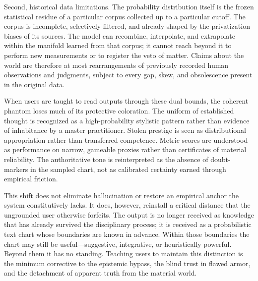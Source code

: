 Second, historical data limitations. The probability distribution itself is the frozen statistical residue of a particular corpus collected up to a particular cutoff. The corpus is incomplete, selectively filtered, and already shaped by the privatization biases of its sources. The model can recombine, interpolate, and extrapolate within the manifold learned from that corpus; it cannot reach beyond it to perform new measurements or to register the veto of matter. Claims about the world are therefore at most rearrangements of previously recorded human observations and judgments, subject to every gap, skew, and obsolescence present in the original data.

When users are taught to read outputs through these dual bounds, the coherent phantom loses much of its protective coloration. The uniform of established thought is recognized as a high-probability stylistic pattern rather than evidence of inhabitance by a master practitioner. Stolen prestige is seen as distributional appropriation rather than transferred competence. Metric scores are understood as performance on narrow, gameable proxies rather than certificates of material reliability. The authoritative tone is reinterpreted as the absence of doubt-markers in the sampled chart, not as calibrated certainty earned through empirical friction.

This shift does not eliminate hallucination or restore an empirical anchor the system constitutively lacks. It does, however, reinstall a critical distance that the ungrounded user otherwise forfeits. The output is no longer received as knowledge that has already survived the disciplinary process; it is received as a probabilistic text chart whose boundaries are known in advance. Within those boundaries the chart may still be useful—suggestive, integrative, or heuristically powerful. Beyond them it has no standing. Teaching users to maintain this distinction is the minimum corrective to the epistemic bypass, the blind trust in flawed armor, and the detachment of apparent truth from the material world.
